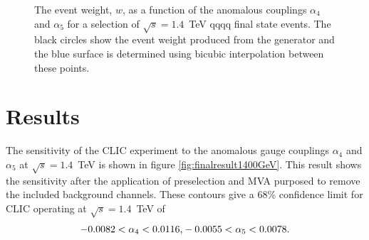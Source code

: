 \begin{figure}[h!]
\caption[The event weight, $w$, as a function of the anomalous couplings $\alpha_{4}$ and $\alpha_{5}$ for a selection of $\sqrt{s}=1.4$~TeV \nu{\nu}qqqq final state events.  The black circles show the event weight produced from the generator and the blue surface is determined using bicubic interpolation between these points.]{The event weight, $w$, as a function of the anomalous couplings $\alpha_{4}$ and $\alpha_{5}$ for a selection of $\sqrt{s}=1.4$~TeV \nu{\nu}qqqq final state events.  The black circles show the event weight produced from the generator and the blue surface is determined using bicubic interpolation between these points.}
\label{fig:eventweights1400interpolated}
\end{figure}


\section{Results}
The sensitivity of the CLIC experiment to the anomalous gauge couplings $\alpha_{4}$ and $\alpha_{5}$ at $\sqrt{s}=1.4$~TeV is shown in figure \ref{fig:finalresult1400GeV}.  This result shows the sensitivity after the application of preselection and MVA purposed to remove the included background channels.  These contours give a 68\% confidence limit for CLIC operating at $\sqrt{s}=1.4$~TeV of
%
\begin{equation}
-0.0082 < \alpha_{4} < 0.0116 \text{,} \\
-0.0055 < \alpha_{5} < 0.0078 \text{.}
\end{equation}

